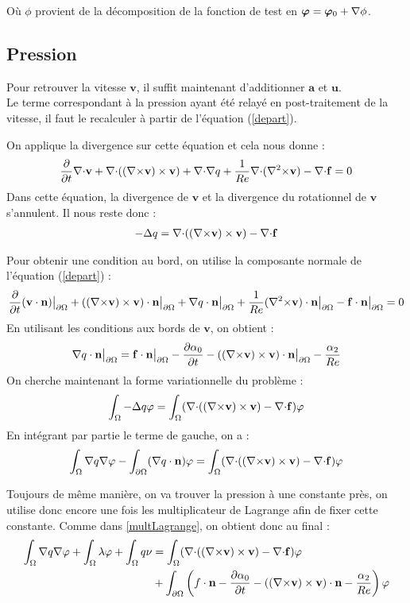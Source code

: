 Où $\phi$ provient de la décomposition de la fonction de test en $\bm{\varphi}=\bm{\varphi}_0+{\nabla}\phi$.

\subsection{Pression}
\label{pression}

Pour retrouver la vitesse $\mathbf{v}$, il suffit maintenant d'additionner $\mathbf{a}$ et $\mathbf{u}$.\\
Le terme correspondant à la pression ayant été relayé en post-traitement de la vitesse, il faut le recalculer à partir de l'équation (\ref{depart}).

On applique la divergence sur cette équation et cela nous donne :
\[
\frac{\partial}{\partial t}{\nabla\cdot} \mathbf{v} + {\nabla\cdot}(({\nabla\times} \mathbf{v})\times \mathbf{v}) + {\nabla\cdot}{\nabla} q + \frac{1}{Re}{\nabla\cdot}({\nabla^2\times} \mathbf{v}) - {\nabla\cdot} \mathbf{f} = 0
\]
Dans cette équation, la divergence de $\mathbf{v}$ et la divergence du rotationnel de $\mathbf{v}$ s'annulent. Il nous reste donc :
\begin{eqnarray}
\label{q}
-{\Delta} q = {\nabla\cdot}(({\nabla\times} \mathbf{v})\times \mathbf{v}) - {\nabla\cdot} \mathbf{f}
\end{eqnarray}

Pour obtenir une condition au bord, on utilise la composante normale de l'équation (\ref{depart}) :
\[
\frac{\partial}{\partial t}(\mathbf{v}\cdot \mathbf{n}){\big\rvert_{\partial\Omega}} + (({\nabla\times} \mathbf{v})\times \mathbf{v})\cdot \mathbf{n}{\big\rvert_{\partial\Omega}} + {\nabla} q\cdot \mathbf{n}{\big\rvert_{\partial\Omega}} +\frac{1}{Re}({\nabla^2\times} \mathbf{v})\cdot \mathbf{n}{\big\rvert_{\partial\Omega}} - \mathbf{f}\cdot \mathbf{n}{\big\rvert_{\partial\Omega}} = 0
\]
En utilisant les conditions aux bords de $\mathbf{v}$, on obtient :
\[
{\nabla} q\cdot \mathbf{n}{\big\rvert_{\partial\Omega}} =  \mathbf{f}\cdot \mathbf{n}{\big\rvert_{\partial\Omega}} - \frac{\partial\alpha_0}{\partial t} - (({\nabla\times} \mathbf{v})\times \mathbf{v})\cdot \mathbf{n}{\big\rvert_{\partial\Omega}} - \frac{\alpha_2}{Re}
\]
On cherche maintenant la forme variationnelle du problème :
\[
\int_\Omega -{\Delta} q\varphi = \int_\Omega ({\nabla\cdot}(({\nabla\times} \mathbf{v})\times \mathbf{v}) -{\nabla\cdot} \mathbf{f})\varphi
\]
En intégrant par partie le terme de gauche, on a :
\[
\int_\Omega {\nabla} q{\nabla}\varphi - \int_{\partial\Omega} ({\nabla} q\cdot \mathbf{n})\varphi = \int_\Omega ({\nabla\cdot}(({\nabla\times} \mathbf{v})\times \mathbf{v}) -{\nabla\cdot} \mathbf{f})\varphi
\]

Toujours de même manière, on va trouver la pression à une constante près, on utilise donc encore une fois les multiplicateur de Lagrange afin de fixer cette constante. Comme dans \ref{multLagrange}, on obtient donc au final :
\begin{equation}
\label{fvq}
\begin{aligned}
\int_\Omega {\nabla} q{\nabla}\varphi + \int_\Omega \lambda\varphi + \int_\Omega q\nu &= \int_\Omega ({\nabla\cdot}(({\nabla\times} \mathbf{v})\times \mathbf{v}) -{\nabla\cdot} \mathbf{f})\varphi\\
&+ \int_{\partial\Omega} \left(f\cdot \mathbf{n} - \frac{\partial\alpha_0}{\partial t} - (({\nabla\times} \mathbf{v})\times \mathbf{v})\cdot \mathbf{n} - \frac{\alpha_2}{Re}\right)\varphi
\end{aligned}
\end{equation}


